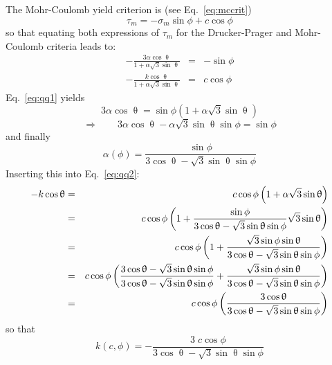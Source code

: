 The Mohr-Coulomb yield criterion is  (see Eq.~\eqref{eq:mccrit})
\[
\tau_m = -\sigma_m \sin\phi + c \cos\phi
\]
so that equating both expressions of $\tau_m$ for the Drucker-Prager 
and Mohr-Coulomb criteria leads to:
\begin{eqnarray}
-\frac{3 \alpha \cos\uptheta}{1 + \alpha \sqrt{3}\sin\uptheta} &=& -\sin\phi \label{eq:qq1}\\
-\frac{k\cos\uptheta}{1 + \alpha \sqrt{3}\sin\uptheta} &=& c \cos\phi \label{eq:qq2}
\end{eqnarray}
Eq.~\eqref{eq:qq1} yields
\[
3 \alpha \cos\uptheta = \sin\phi (1 + \alpha \sqrt{3}\sin\uptheta) 
\]
\[
\Rightarrow \qquad 3 \alpha \cos\uptheta - \alpha \sqrt{3}\sin\uptheta \sin\phi = \sin\phi 
\]
and finally 
\begin{equation}
\boxed{
\alpha(\phi) =  \frac{\sin\phi}{ 3 \cos\uptheta - \sqrt{3}\sin\uptheta \sin\phi}
}
\label{eq:dpalpha}
\end{equation}
Inserting this into Eq.~\eqref{eq:qq2}:
\begin{eqnarray}
- k \cos\uptheta 
&=& c \cos \phi \left(1 +\alpha \sqrt{3} \sin\uptheta \right)  \nonumber\\
&=& c \cos \phi \left(1 + \frac{\sin\phi}{ 3 \cos\uptheta - \sqrt{3}\sin\uptheta \sin\phi}  \sqrt{3} \sin\uptheta\right) \nonumber\\
&=& c \cos \phi \left(1 + 
\frac{ \sqrt{3}\sin\phi \sin\uptheta }{ 3 \cos\uptheta - \sqrt{3}\sin\uptheta \sin\phi} \right) \nonumber\\
&=& c \cos \phi \left(
\frac{ 3 \cos\uptheta - \sqrt{3}\sin\uptheta \sin\phi}{ 3 \cos\uptheta - \sqrt{3}\sin\uptheta \sin\phi} 
+ 
\frac{ \sqrt{3}\sin\phi \sin\uptheta }{ 3 \cos\uptheta - \sqrt{3}\sin\uptheta \sin\phi} \right) \nonumber\\
&=& c \cos \phi \left(
\frac{ 3 \cos\uptheta}{ 3 \cos\uptheta - \sqrt{3}\sin\uptheta \sin\phi} \right) \nonumber
\end{eqnarray}
so that 
\begin{equation}
\boxed{
k(c,\phi) =- \frac{ 3\; c \cos \phi }{ 3 \cos\uptheta - \sqrt{3}\sin\uptheta \sin\phi} 
}
\label{eq:dpk}
\end{equation}

